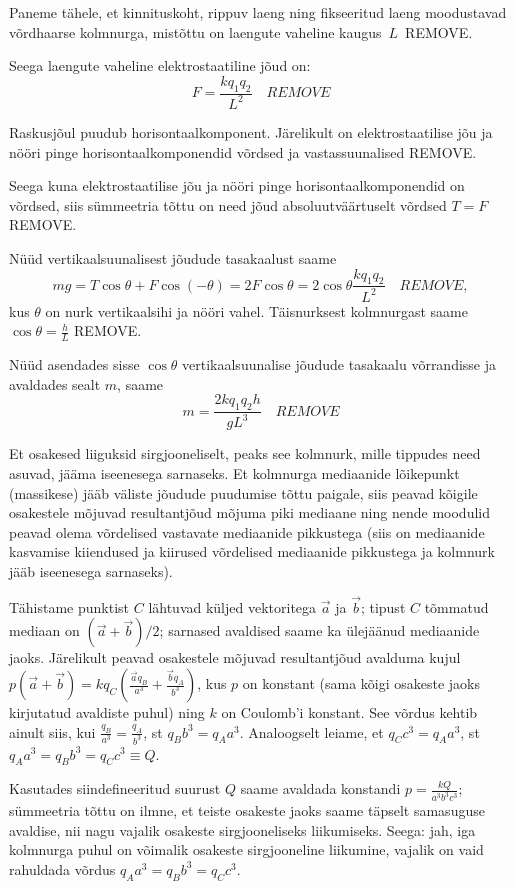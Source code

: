 \documentclass[10pt]{article}
\newcommand{\pp}[1]{REMOVE}
\begin{document}
Paneme tähele, et kinnituskoht, rippuv laeng ning fikseeritud laeng moodustavad võrdhaarse kolmnurga, mistõttu on laengute vaheline kaugus~$L$~\pp1.

Seega laengute vaheline elektrostaatiline jõud on:
$$F=\frac{kq_1q_2}{L^2} \quad \pp1$$

Raskusjõul puudub horisontaalkomponent. Järelikult on elektrostaatilise jõu ja nööri pinge horisontaalkomponendid võrdsed ja vastassuunalised \pp1.

Seega kuna elektrostaatilise jõu ja nööri pinge horisontaalkomponendid on võrdsed, siis sümmeetria tõttu on need jõud absoluutväärtuselt võrdsed $T=F$ \pp1.

Nüüd vertikaalsuunalisest jõudude tasakaalust saame
$$mg=T\cos\theta + F\cos (-\theta) = 2F\cos\theta = 2 \cos\theta \frac{kq_1q_2}{L^2} \quad \pp3,$$
kus $\theta$ on nurk vertikaalsihi ja nööri vahel.
Täisnurksest kolmnurgast saame $\cos\theta = \frac hL$ \pp1.

Nüüd asendades sisse $\cos\theta$ vertikaalsuunalise jõudude tasakaalu võrrandisse ja avaldades sealt $m$, saame
$$m=\frac{2kq_1q_2h}{gL^3} \quad \pp1$$
\probend
\bigskip


\solu
Et osakesed liiguksid sirgjooneliselt, peaks see kolmnurk, mille tippudes need asuvad, jääma iseenesega sarnaseks. Et kolmnurga mediaanide lõikepunkt (massikese) jääb väliste jõudude puudumise tõttu paigale, siis peavad kõigile osakestele mõjuvad resultantjõud mõjuma piki mediaane ning nende moodulid peavad olema võrdelised vastavate mediaanide pikkustega (siis on mediaanide kasvamise kiiendused ja kiirused võrdelised mediaanide pikkustega ja kolmnurk jääb iseenesega sarnaseks).

Tähistame punktist $C$ lähtuvad küljed vektoritega $\vec a$ ja $\vec b$; tipust $C$ tõmmatud mediaan on $(\vec a+\vec b)/2$; sarnased avaldised saame ka ülejäänud mediaanide jaoks. Järelikult peavad osakestele mõjuvad resultantjõud avalduma kujul $p(\vec a+\vec b)=kq_C(\frac {\vec aq_B}{a^3}+\frac {\vec bq_A}{b^3})$, kus $p$ on konstant (sama kõigi osakeste jaoks kirjutatud avaldiste puhul) ning $k$ on Coulomb'i konstant. See võrdus kehtib ainult siis, kui $\frac {q_B}{a^3}=\frac {q_A}{b^3}$, st $q_Bb^3=q_Aa^3$. Analoogselt leiame, et  $q_Cc^3=q_Aa^3$, st $q_Aa^3=q_Bb^3=q_Cc^3\equiv Q$.

Kasutades siindefineeritud suurust  $Q$ saame avaldada konstandi $p=\frac {kQ}{a^3b^3c^3}$; sümmeetria tõttu on ilmne, et teiste osakeste jaoks saame täpselt samasuguse avaldise, nii nagu vajalik osakeste sirgjooneliseks liikumiseks. Seega: jah, iga kolmnurga puhul on võimalik osakeste sirgjooneline liikumine, vajalik on vaid rahuldada võrdus $q_Aa^3=q_Bb^3=q_Cc^3$.
\probend
\bigskip
\end{document}
